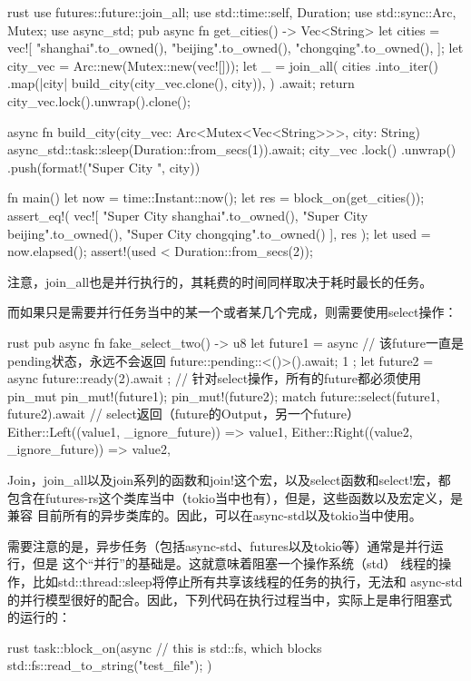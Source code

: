\begin{code-block}{rust}
use futures::future::join_all;
use std::time::{self, Duration};
use std::sync::{Arc, Mutex};
use async_std;
pub async fn get_cities() -> Vec<String> {
    let cities = vec![
        "shanghai".to_owned(),
        "beijing".to_owned(),
        "chongqing".to_owned(),
    ];
    let city_vec = Arc::new(Mutex::new(vec![]));
    let _ = join_all(
        cities
            .into_iter()
            .map(|city| build_city(city_vec.clone(), city)),
    )
    .await;
    return city_vec.lock().unwrap().clone();
}

async fn build_city(city_vec: Arc<Mutex<Vec<String>>>, city: String) {
    async_std::task::sleep(Duration::from_secs(1)).await;
    city_vec
        .lock()
        .unwrap()
        .push(format!("Super City {}", city))
}

fn main() {
    let now = time::Instant::now();
    let res = block_on(get_cities());
    assert_eq!(
        vec![
            "Super City shanghai".to_owned(),
            "Super City beijing".to_owned(),
            "Super City chongqing".to_owned()
        ],
        res
    );
    let used = now.elapsed();
    assert!(used < Duration::from_secs(2));
}
\end{code-block}
注意，join\_all也是并行执行的，其耗费的时间同样取决于耗时最长的任务。

而如果只是需要并行任务当中的某一个或者某几个完成，则需要使用select操作：
\begin{code-block}{rust}
pub async fn fake_select_two() -> u8 {
    let future1 = async {
        // 该future一直是pending状态，永远不会返回
        future::pending::<()>().await;
        1
    };
    let future2 = async { future::ready(2).await };
    // 针对select操作，所有的future都必须使用pin_mut
    pin_mut!(future1);
    pin_mut!(future2);
    match future::select(future1, future2).await {
        // select返回（future的Output，另一个future）
        Either::Left((value1, _ignore_future)) => value1,
        Either::Right((value2, _ignore_future)) => value2,
    }
}
\end{code-block}

\begin{attention}
Join，join\_all以及join系列的函数和join!这个宏，以及select函数和select!宏，都
包含在futures-rs这个类库当中（tokio当中也有），但是，这些函数以及宏定义，是兼容
目前所有的异步类库的。因此，可以在async-std以及tokio当中使用。
\end{attention}

需要注意的是，异步任务（包括async-std、futures以及tokio等）通常是并行运行，但是
这个“并行”的基础是。这就意味着阻塞一个操作系统（std）
线程的操作，比如std::thread::sleep将停止所有共享该线程的任务的执行，无法和
async-std的并行模型很好的配合。因此，下列代码在执行过程当中，实际上是串行阻塞式
的运行的：
\begin{code-block}{rust}
task::block_on(async {
    // this is std::fs, which blocks
    std::fs::read_to_string("test_file");
})
\end{code-block}

